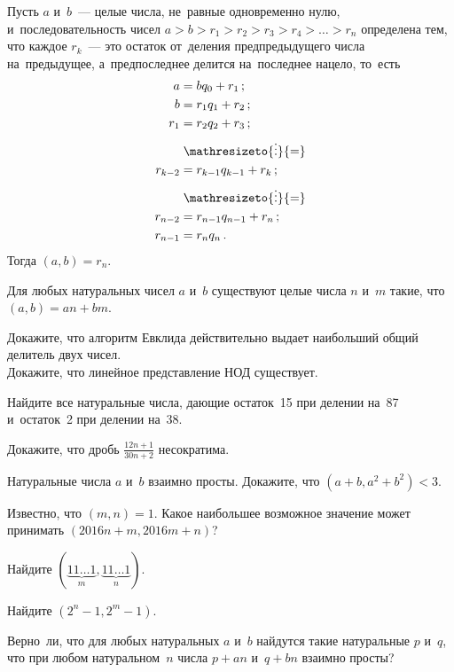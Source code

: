 


Пусть $a$ и~$b$~--- целые числа, не~равные одновременно нулю,
и~последовательность чисел
$a > b > r_{1} > r_{2} > r_{3} > r_{4} > \ldots > r_{n}$
определена тем, что каждое $r_k$~--- это остаток от~деления предпредыдущего
числа на~предыдущее, а~предпоследнее делится на~последнее нацело, то~есть
\begin{align*}
    a &= b q_0 + r_1
\, ; \\
    b &= r_1 q_1 + r_2
\, ; \\
    r_{1} &= r_2q_2 + r_3
\, ; \\ & \mathrel{\mathresizeto{\vdots}{=}} \\
    r_{k-2} &= r_{k-1} q_{k-1} + r_{k}
\, ; \\ & \mathrel{\mathresizeto{\vdots}{=}} \\
    r_{n-2} &= r_{n-1} q_{n-1} + r_n
\, ; \\
    r_{n-1} &= r_{n} q_{n}
\, . \end{align*}
Тогда $(a, b) = r_{n}$.

Для любых натуральных чисел $a$ и~$b$ существуют целые числа $n$ и~$m$ такие,
что $(a, b) = a n + b m$.

\begin{problems}

\subproblem
Докажите, что алгоритм Евклида действительно выдает наибольший общий делитель
двух чисел.
\\
\subproblem
Докажите, что линейное представление НОД существует.

\item
Найдите все натуральные числа, дающие остаток~15 при делении на~87 и~остаток~2
при делении на~38.

\item
Докажите, что дробь $\frac{12 n + 1}{30 n + 2}$ несократима.

\item
Натуральные числа $a$ и~$b$ взаимно просты.
Докажите, что $(a + b, a^2 + b^2) < 3$.

\item
Известно, что $(m, n) = 1$.
Какое наибольшее возможное значение может принимать $(2016 n + m, 2016 m + n)$?

\item
Найдите $(\underbrace{11 \ldots 1}_{m}, \underbrace{11 \ldots 1}_{n})$.

\item
Найдите $(2^{n} - 1, 2^{m} - 1)$.

\item
Верно~ли, что для любых натуральных $a$ и~$b$ найдутся такие натуральные $p$
и~$q$, что при любом натуральном~$n$ числа $p + a n$ и~$q + b n$ взаимно
просты?

\end{problems}

